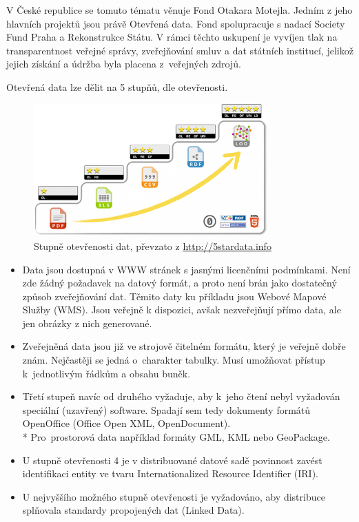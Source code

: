 V České republice se tomuto tématu věnuje Fond Otakara Motejla. Jedním z jeho hlavních projektů jsou právě Otevřená data. Fond spolupracuje s nadací Society Fund
Praha a Rekonstrukce Státu.
V rámci těchto uskupení je vyvíjen tlak na transparentnost veřejné správy,
zveřejňování smluv a dat státních institucí, jelikož jejich získání a údržba byla
placena z~veřejných zdrojů.

\newpage
Otevřená data lze dělit na 5 stupňů,
dle otevřenosti.

\begin{figure}[hbt]
    \centering
    \includegraphics[width=0.8\textwidth]{./pictures/5star-steps.png}
    \caption{Stupně otevřenosti dat, převzato z \url{http://5stardata.info}}
    \label{fig:Stupně otevřenosti dat}
\end{figure}

\begin{itemize}

    \item   Data jsou dostupná v WWW stránek s jasnými licenčními
            podmínkami. Není zde žádný požadavek na datový formát,
            a proto není brán jako dostatečný způsob zveřejňování dat.
            Těmito daty ku příkladu jsou Webové Mapové Služby (WMS).
            Jsou veřejně k dispozici, avšak nezveřejňují přímo data,
            ale jen obrázky z nich generované.

    \item   Zveřejněná data jsou již ve strojově čitelném formátu,
            který je veřejně dobře znám. Nejčastěji se jedná
            o~charakter tabulky. Musí umožňovat přístup k~jednotlivým
            řádkům a obsahu buněk.

    \item   Třetí stupeň navíc od druhého vyžaduje, aby k~jeho čtení
            nebyl vyžadován speciální (uzavřený) software. Spadají sem tedy dokumenty formátů
            OpenOffice (Office Open XML, OpenDocument).
        \\* Pro~prostorová data například formáty GML, KML nebo
            GeoPackage.

    \item   U stupně otevřenosti 4 je v distribuované datové sadě
            povinnost zavést identifikaci entity ve tvaru
            Internationalized Resource Identifier (IRI).

    \item   U nejvyššího možného stupně otevřenosti je vyžadováno, aby
            distribuce splňovala standardy propojených dat (Linked
            Data). \cite{OpendataStupne}

\end{itemize}

